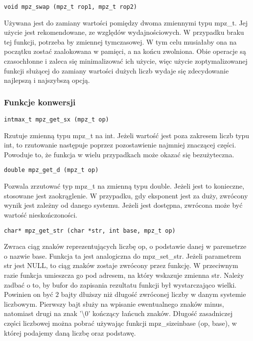 \documentclass[twoside,a4paper]{book}
\begin{document}
\begin{lstlisting}
void mpz_swap (mpz_t rop1, mpz_t rop2)
\end{lstlisting}

Używana jest do zamiany wartości pomiędzy dwoma zmiennymi typu mpz\_t. Jej użycie jest rekomendowane, ze względów wydajnościowych. W przypadku braku tej funkcji, potrzeba by zmiennej tymczasowej. W tym celu musiałaby ona na początku zostać zaalokowana w pamięci, a na końcu zwolniona. Obie operacje są czasochłonne i zaleca się minimalizować ich użycie, więc użycie zoptymalizowanej funkcji służącej do zamiany wartości dużych liczb wydaje się zdecydowanie najlepszą i najszybszą opcją.

\subsubsection{Funkcje konwersji}

\begin{lstlisting}
intmax_t mpz_get_sx (mpz_t op)
\end{lstlisting}

Rzutuje zmienną typu mpz\_t na int. Jeżeli wartość jest poza zakresem liczb typu int, to rzutowanie następuje poprzez pozostawienie najmniej znaczącej części. Powoduje to, że funkcja w wielu przypadkach może okazać się bezużyteczna.

\begin{lstlisting}
double mpz_get_d (mpz_t op)
\end{lstlisting}

Pozwala zrzutować typ mpz\_t na zmienną typu double. Jeżeli jest to konieczne, stosowane jest zaokrąglenie. W przypadku, gdy eksponent jest za duży, zwrócony wynik jest zależny od danego systemu. Jeżeli jest dostępna, zwrócona może być wartość nieskończoności.

\begin{lstlisting}
char* mpz_get_str (char *str, int base, mpz_t op)
\end{lstlisting}

Zwraca ciąg znaków reprezentujących liczbę op, o podstawie danej w paremetrze o nazwie base. Funkcja ta jest analogiczna do mpz\_set\_str. Jeżeli parametrem str jest NULL, to ciąg znaków zostaje zwrócony przez funkcję. W przeciwnym razie funkcja umieszcza go pod adresem, na który wskazuje zmienna str. Należy zadbać o to, by bufor do zapisania rezultatu funkcji był wystarczająco wielki. Powinien on być $2$ bajty dłuższy niż długość zwróconej liczby w danym systemie liczbowym. Pierwszy bajt służy na wpisanie ewentualnego znaków minus, natomiast drugi na znak '\textbackslash$0$' kończący łańcuch znaków. Długość zasadniczej części liczbowej można pobrać używając funkcji mpz\_sizeinbase (op, base), w której podajemy daną liczbę oraz podstawę.
\end{document}
